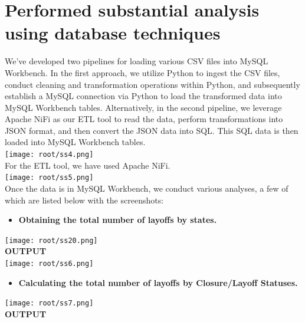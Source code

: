 \section{\Large\textbf{Performed substantial analysis using database techniques}}
{We've developed two pipelines for loading various CSV files into MySQL Workbench. In the first approach, we utilize Python to ingest the CSV files, conduct cleaning and transformation operations within Python, and subsequently establish a MySQL connection via Python to load the transformed data into MySQL Workbench tables. 
Alternatively, in the second pipeline, we leverage Apache NiFi as our ETL tool to read the data, perform transformations into JSON format, and then convert the JSON data into SQL. This SQL data is then loaded into MySQL Workbench tables.
}\\
\vspace{2cm}
\texttt{[image: root/ss4.png]}~\\\vspace*{-1cm}
{For the ETL tool, we have used Apache NiFi.}
\vspace{2cm}\\
\vspace{2cm}
\texttt{[image: root/ss5.png]}~\\
{Once the data is in MySQL Workbench, we conduct various analyses, a few of which are listed below with the screenshots:}
\vspace{2cm}
\begin{itemize}
    \item \textbf{Obtaining the total number of layoffs by states.}
\end{itemize}

\vspace{2cm}
\texttt{[image: root/ss20.png]}~\\\vspace*{-1cm}
\textbf{{OUTPUT}}\\

\texttt{[image: root/ss6.png]}~\\\vspace*{-1cm}

\begin{itemize}
    \item \textbf{Calculating the total number of layoffs by Closure/Layoff Statuses.}

\end{itemize}

\texttt{[image: root/ss7.png]}~\\\vspace*{-1cm}
\textbf{{OUTPUT}}\\

